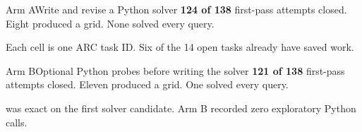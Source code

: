 \begin{frame}[t]{Arm A\enspace Write and revise a Python solver}
\med
\textbf{124 of 138} first-pass attempts closed. Eight produced a grid. None solved every query.
\par\vspace{3mm}

\vfill
\smallbody Each cell is one ARC task ID. Six of the 14 open tasks already have saved work.
\end{frame}

\begin{frame}[t]{Arm B\enspace Optional Python probes before writing the solver}
\med
\textbf{121 of 138} first-pass attempts closed. Eleven produced a grid. One solved every query.
\par\vspace{3mm}

\vfill
\smallbody {} was exact on the first solver candidate. Arm B recorded zero exploratory Python calls.
\end{frame}
